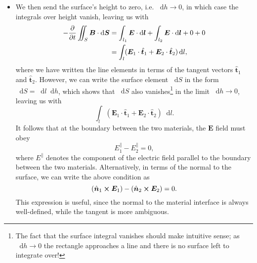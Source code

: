 \documentclass[11pt, a4paper]{article}
\newcommand{\diff}{\mathop{}\!\mathrm{d}} %
\renewcommand{\vec}[1]{\bm{#1}} %
\newcommand{\uvec}[1]{\hat{\vec{#1}}} %
\newcommand{\E}{\vec{E}} %
\newcommand{\B}{\vec{B}} %
\begin{document}
\begin{itemize}
    \item We then send the surface's height to zero, i.e. $ \diff h \to 0 $, in which case the integrals over height vanish, leaving us with
    \begin{align*}
        - \pdv{t}\iint_{S}\B \cdot \diff \vec{S} &= \int_{l_{1}}\E \cdot \diff \vec{l} + \int_{l_{2}}\E \cdot \diff \vec{l} + 0 + 0\\
        & = \int_{l} (\E_{1}\cdot \uvec{t}_{1} + \E_{2}\cdot \uvec{t}_{2}) \diff l,
    \end{align*}
    where we have written the line elements in terms of the tangent vectors $ \uvec{t}_{1} $ and $ \uvec{t}_{2} $. However, we can write the surface element $ \diff S $ in the form $ \diff S = \diff l \diff h $, which shows that $ \diff S $ also vanishes\footnote{The fact that the surface integral vanishes should make intuitive sense; as $ \diff h \to 0 $ the rectangle approaches a line and there is no surface left to integrate over!} in the limit $ \diff h \to 0 $, leaving us with
    \begin{equation*}
        \int_{l} (\E_{1}\cdot \uvec{t}_{1} + \E_{2}\cdot \uvec{t}_{2}) \diff l.
    \end{equation*}
    It follows that at the boundary between the two materials, the $ \E $ field must obey
    \begin{equation*}
        E_{1}^{\parallel} - E_{2}^{\parallel} = 0,
    \end{equation*}
    where $ E^{\parallel} $ denotes the component of the electric field parallel to the boundary between the two materials. Alternatively, in terms of the normal to the surface, we can write the above condition as
	\begin{equation*}
		(\uvec{n}_{1} \cross \E_{1}) - (\uvec{n}_{2}\cross \E_{2}) = 0.
	\end{equation*}
	This expression is useful, since the normal to the material interface is always well-defined, while the tangent is more ambiguous.

\end{itemize}
\end{document}
